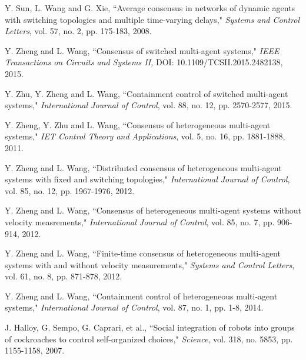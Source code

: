 \documentclass[12pt,draftcls,onecolumn]{IEEEtran}
\begin{document}
\begin{thebibliography}{1}
Y. Sun, L. Wang and G. Xie,
``Average consensus in networks of dynamic agents with switching topologies and multiple time-varying delays,"
\emph{Systems and Control Letters}, vol. 57, no. 2, pp. 175-183, 2008.

Y. Zheng and L. Wang,
``Consensus of switched multi-agent systems,"
\emph{IEEE Transactions on Circuits and Systems II,} DOI: 10.1109/TCSII.2015.2482138, 2015.

Y. Zhu, Y. Zheng and L. Wang,
``Containment control of switched multi-agent systems,"
\emph{International Journal of Control}, vol. 88, no. 12, pp. 2570-2577, 2015.

Y. Zheng, Y. Zhu and L. Wang,
``Consensus of heterogeneous multi-agent systems,"
\emph{IET Control Theory and Applications}, vol. 5, no. 16, pp. 1881-1888, 2011.

Y. Zheng and L. Wang,
``Distributed consensus of heterogeneous multi-agent systems with fixed and switching topologies,"
\emph{International Journal of Control}, vol. 85, no. 12, pp. 1967-1976, 2012.

Y. Zheng and L. Wang,
``Consensus of heterogeneous multi-agent systems without velocity measrements,"
\emph{International Journal of Control}, vol. 85, no. 7, pp. 906-914, 2012.

Y. Zheng and L. Wang,
``Finite-time consensus of heterogeneous multi-agent systems with and without velocity measurements,"
\emph{Systems and Control Letters}, vol. 61, no. 8, pp. 871-878, 2012.

Y. Zheng and L. Wang,
``Containment control of heterogeneous multi-agent systems,"
\emph{International Journal of Control}, vol. 87, no. 1, pp. 1-8, 2014.

J. Halloy, G. Sempo, G. Caprari, et al.,
``Social integration of robots into groups of cockroaches to control self-organized choices," \emph{Science}, vol. 318, no. 5853,  pp. 1155-1158, 2007.

\end{thebibliography}
\end{document}
